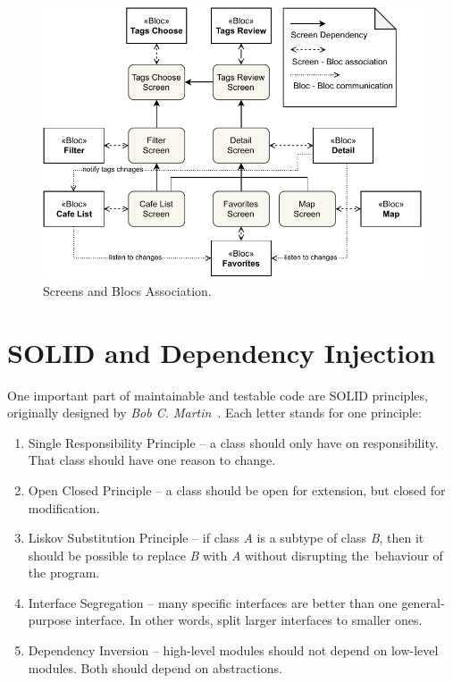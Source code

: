 \begin{figure}[h!]
    \centering
    \includegraphics[width=\textwidth]{img/implementation/bloc-screens-dependencies.pdf}
    \caption{Screens and Blocs Association.}
    \label{fig:ct-screens-bloc}
\end{figure}

\section{SOLID and Dependency Injection}
One important part of maintainable and testable code are SOLID principles, originally designed by \textit{Bob C. Martin}~\cite{bob-martin-design-patterns}. Each letter stands for one principle: 

\begin{enumerate}
    \item Single Responsibility Principle -- a class should only have on responsibility. That class should have one reason to change.
    \item Open Closed Principle -- a class should be open for extension, but closed for modification. 
    \item Liskov Substitution Principle -- if class \textit{A} is a subtype of class \textit{B}, then it should be possible to replace \textit{B} with \textit{A} without disrupting the~behaviour of the program. 
    \item Interface Segregation -- many specific interfaces are better than one general-purpose interface. In other words, split larger interfaces to smaller ones. 
    \item Dependency Inversion -- high-level modules should not depend on low-level modules. Both should depend on abstractions.
\end{enumerate}

